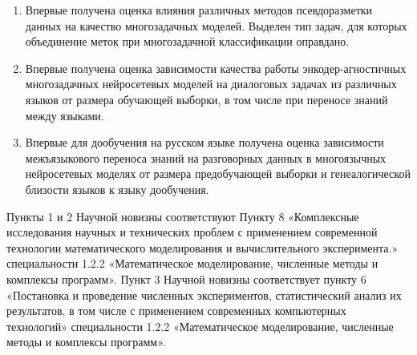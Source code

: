 {\novelty}
\begin{enumerate}
  \item {Впервые получена оценка влияния различных методов псевдоразметки данных на качество многозадачных моделей. Выделен тип задач, для которых объединение меток при многозадачной классификации оправдано.}
  \item {Впервые получена  оценка зависимости качества  работы энкодер-агностичных многозадачных нейросетевых моделей на диалоговых задачах из различных языков от размера обучающей выборки, в том числе при переносе знаний между языками.}
  \item {Впервые для дообучения на русском языке получена оценка зависимости межъязыкового переноса знаний на разговорных данных в многоязычных нейросетевых моделях от размера предобучающей выборки и генеалогической близости языков к языку дообучения.}
\end{enumerate}

{\appropriation}
Пункты 1 и 2 Научной новизны соответствуют Пункту 8 «Комплексные исследования научных и технических проблем с применением современной технологии математического моделирования и вычислительного эксперимента.» специальности 1.2.2 «Математическое моделирование, численные методы и комплексы программ». 
Пункт 3 Научной новизны соответствует пункту 6 «Постановка и проведение численных экспериментов, статистический анализ их результатов, в том числе с применением современных
компьютерных технологий» специальности 1.2.2 «Математическое моделирование, численные методы и комплексы программ». %

